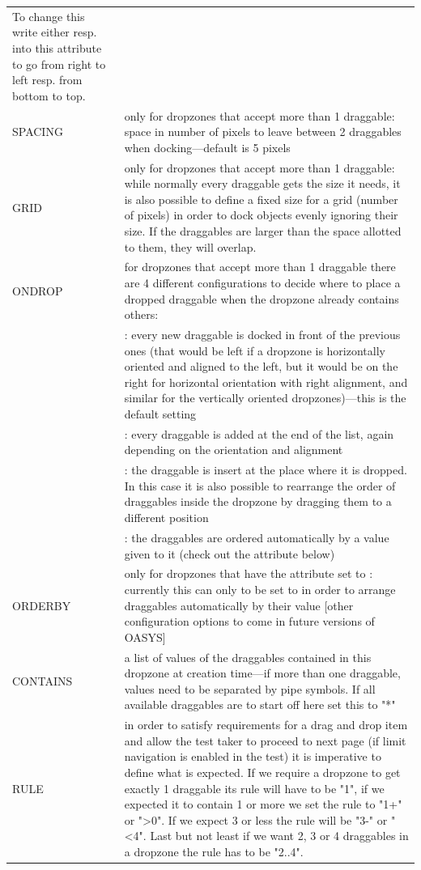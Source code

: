 \documentclass[12pt]{article} %
\newenvironment{keyword}{\leavevmode\color{magenta}}{}
\newenvironment{properties}
	{
    	\footnotesize\renewcommand{\arraystretch}{1.30}
  		\renewcommand{\tabcolsep}{0pt}
   		\begin{longtable}{>{\begin{keyword}}p{3.1cm}<{\end{keyword}}p{13.9cm}}
    	\hline
	}
	{
		\hline\end{longtable}\vspace{5mm}
	}
\begin{document}
\begin{properties}
To change this write either \kw{right} resp. \kw{bottom} into this attribute to go from right to left resp.
from bottom to top. \\
SPACING & only for dropzones that accept more than 1 draggable: space in number of pixels to leave between 2 draggables when docking—default is 5 pixels \\
GRID &  only for dropzones that accept more than 1 draggable: while normally every draggable gets the size it needs, it is also possible to define a fixed size for a grid (number of pixels) in order to dock objects evenly ignoring their size.
If the draggables are larger than the space allotted to them, they will overlap. \\
ONDROP & for dropzones that accept more than 1 draggable there are 4 different configurations to decide where to place a dropped draggable when the dropzone already contains others: \\
& \kw{beginning}: every new draggable is docked in front of the previous ones (that would be left if a dropzone is horizontally oriented and aligned to the left, but it would be on the right for horizontal orientation with right alignment, and similar for the vertically oriented dropzones)—this is the default setting \\
& \kw{end}: every draggable is added at the end of the list, again depending on the orientation and alignment \\
& \kw{insert}: the draggable is insert at the place where it is dropped.
In this case it is also possible to rearrange the order of draggables inside the dropzone by dragging them to a different position \\
& \kw{auto}: the draggables are ordered automatically by a value given to it (check out the \kw{ORDERBY} attribute below) \\
ORDERBY &  only for dropzones that have the \kw{ONDROP} attribute set to \kw{auto}: currently this can only to be set to \kw{value} in order to arrange draggables automatically by their value [other configuration options to come in future versions of OASYS] \\
CONTAINS & a list of values of the draggables contained in this dropzone at creation time—if more than one draggable, values need to be separated by pipe symbols.
If all available draggables are to start off here set this to "*"\\
RULE & in order to satisfy requirements for a drag and drop item and allow the test taker to proceed to next page (if limit navigation is enabled in the test) it is imperative to define what is expected.
If we require a dropzone to get exactly 1 draggable its rule will have to be "1", if we expected it to contain 1 or more we set the rule to "1+" or ">0".
If we expect 3 or less the rule will be "3-" or "<4".
Last but not least if we want 2, 3 or 4 draggables in a dropzone the rule has to be "2..4". \\
\hline
\end{properties}
\vspace{0.1cm}
\end{document}
